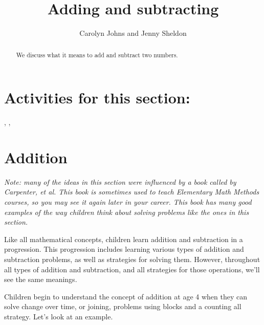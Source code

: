 \documentclass{ximera}
\title{Adding and subtracting}
\author{Carolyn Johns and Jenny Sheldon}
\begin{document}
\begin{abstract}
We discuss what it means to add and subtract two numbers.
\end{abstract}
\maketitle

\section{Activities for this section:} 
, 
, 


\section{Addition}

\emph{Note: many of the ideas in this section were influenced by a book called  by Carpenter, et al. This book is sometimes used to teach Elementary Math Methods courses, so you may see it again later in your career. This book has many good examples of the way children think about solving problems like the ones in this section.}



Like all mathematical concepts, children learn addition and subtraction in a progression. This progression includes learning various types of addition and subtraction problems, as well as strategies for solving them. However, throughout all types of addition and subtraction, and all strategies for those operations, we'll see the same meanings.

Children begin to understand the concept of addition at age 4 when they can solve change over time, or joining, problems using blocks and a counting all strategy. Let's look at an example.
\end{document}
